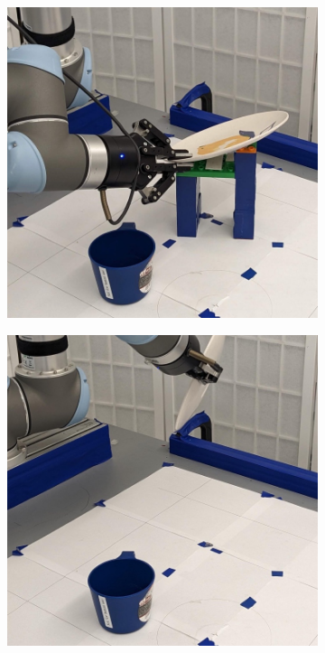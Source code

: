 \documentclass{article}
\begin{document}
\begin{figure}[]
\begin{subfigure}{(\linewidth - 0.05\linewidth)/5}
    \end{subfigure}
    \begin{subfigure}{(\linewidth - 0.05\linewidth)/5}
        \centering
        \includegraphics[width=\linewidth]{figures/episodes/bowl_on_mug/5.jpg}
    \end{subfigure}
    \begin{subfigure}{(\linewidth - 0.05\linewidth)/5}
        \centering
        \includegraphics[width=\linewidth]{figures/episodes/bowl_on_mug/6.jpg}

\end{subfigure}
\end{figure}
\end{document}
